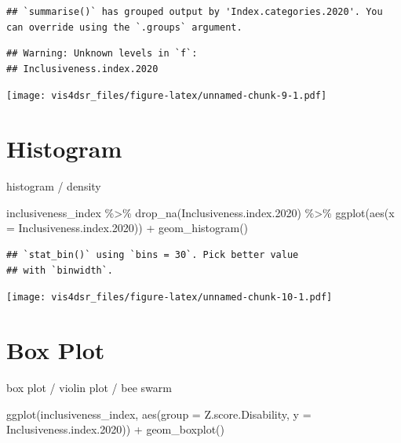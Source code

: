 \documentclass[
]{krantz}
\makeatletter
\newenvironment{Shaded}{\begin{snugshade}}{\end{snugshade}}
\newcommand{\AttributeTok}[1]{\textcolor[rgb]{0.61,0.61,0.61}{#1}}
\newcommand{\FloatTok}[1]{\textcolor[rgb]{0.06,0.06,0.06}{#1}}
\newcommand{\FunctionTok}[1]{\textcolor[rgb]{0,0,0}{#1}}
\newcommand{\NormalTok}[1]{#1}
\newcommand{\SpecialCharTok}[1]{\textcolor[rgb]{0,0,0}{#1}}
\newenvironment{kframe}{%
\medskip{}
\setlength{\fboxsep}{.8em}
 \def\at@end@of@kframe{}%
 \ifinner\ifhmode%
  \def\at@end@of@kframe{\end{minipage}}%
  \begin{minipage}{\columnwidth}%
 \fi\fi%
 \def\FrameCommand##1{\hskip\@totalleftmargin \hskip-\fboxsep
 \colorbox{shadecolor}{##1}\hskip-\fboxsep
     \hskip-\linewidth \hskip-\@totalleftmargin \hskip\columnwidth}%
 \MakeFramed {\advance\hsize-\width
   \@totalleftmargin\z@ \linewidth\hsize
   \@setminipage}}%
 {\par\unskip\endMakeFramed%
 \at@end@of@kframe}
\renewenvironment{Shaded}{\begin{kframe}}{\end{kframe}}
\makeatother
\begin{document}
\begin{verbatim}
## `summarise()` has grouped output by 'Index.categories.2020'. You can override using the `.groups` argument.
\end{verbatim}

\begin{verbatim}
## Warning: Unknown levels in `f`:
## Inclusiveness.index.2020
\end{verbatim}

\texttt{[image: vis4dsr\_files/figure-latex/unnamed-chunk-9-1.pdf]}

\hypertarget{histogram}{%
\section{Histogram}\label{histogram}}

histogram / density

\begin{Shaded}
\begin{Highlighting}[]
\NormalTok{inclusiveness\_index }\SpecialCharTok{\%\textgreater{}\%}
  \FunctionTok{drop\_na}\NormalTok{(Inclusiveness.index}\FloatTok{.2020}\NormalTok{) }\SpecialCharTok{\%\textgreater{}\%}
  \FunctionTok{ggplot}\NormalTok{(}\FunctionTok{aes}\NormalTok{(}\AttributeTok{x =}\NormalTok{ Inclusiveness.index}\FloatTok{.2020}\NormalTok{)) }\SpecialCharTok{+}
    \FunctionTok{geom\_histogram}\NormalTok{()}
\end{Highlighting}
\end{Shaded}

\begin{verbatim}
## `stat_bin()` using `bins = 30`. Pick better value
## with `binwidth`.
\end{verbatim}

\texttt{[image: vis4dsr\_files/figure-latex/unnamed-chunk-10-1.pdf]}

\hypertarget{box-plot}{%
\section{Box Plot}\label{box-plot}}

box plot / violin plot / bee swarm

\begin{Shaded}
\begin{Highlighting}[]
\FunctionTok{ggplot}\NormalTok{(inclusiveness\_index, }
       \FunctionTok{aes}\NormalTok{(}\AttributeTok{group =}\NormalTok{ Z.score.Disability, }
           \AttributeTok{y =}\NormalTok{ Inclusiveness.index}\FloatTok{.2020}\NormalTok{)) }\SpecialCharTok{+}
  \FunctionTok{geom\_boxplot}\NormalTok{()}
\end{Highlighting}
\end{Shaded}
\end{document}
